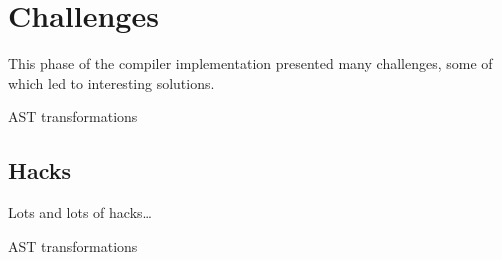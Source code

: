 \documentclass[pdftex,11pt,a4paper]{article}
\begin{document}
\section{Challenges}

This phase of the compiler implementation presented many
challenges, some of which led to interesting solutions.

AST transformations


\subsection{Hacks}

Lots and lots of hacks\ldots

AST transformations
\end{document}
